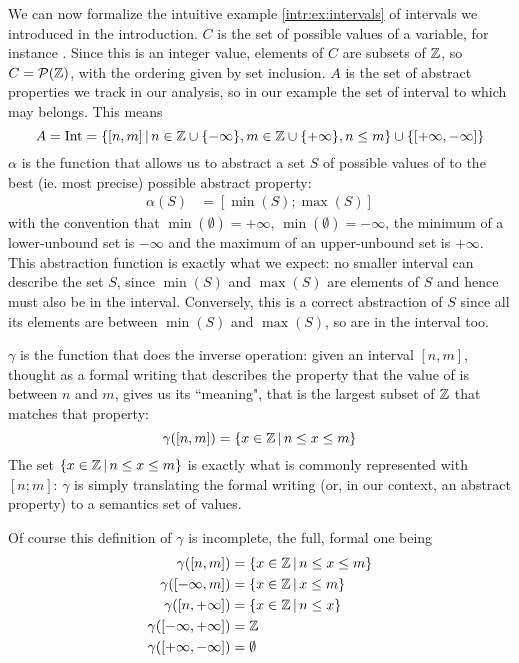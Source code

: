 \begin{example}[Intervals]\label{ch2:ex:intervals}
	We can now formalize the intuitive example \ref{intr:ex:intervals} of intervals we introduced in the introduction.
	$C$ is the set of possible values of a variable, for instance . Since this is an integer value, elements of $C$ are subsets of $\mathbb{Z}$, so $C = \mathcal{P}(\mathbb{Z})$, with the ordering given by set inclusion. $A$ is the set of abstract properties we track in our analysis, so in our example the set of interval to which  may belongs. This means
	\[
	A = \text{Int} = \{ [n, m] \,\vert\, n \in \mathbb{Z} \cup \{ -\infty \}, m \in \mathbb{Z} \cup \{ +\infty \}, n \le m \} \cup \{ [+\infty, -\infty] \}
	\]
	$\alpha$ is the function that allows us to abstract a set $S$ of possible values of  to the best (ie. most precise) possible abstract property:
	\begin{align*}
		\alpha(S) &= [\min(S); \max(S)]
	\end{align*}
	with the convention that $\min(\emptyset) = +\infty$, $\min(\emptyset) = -\infty$, the minimum of a lower-unbound set is $-\infty$ and the maximum of an upper-unbound set is $+\infty$. This abstraction function is exactly what we expect: no smaller interval can describe the set $S$, since $\min(S)$ and $\max(S)$ are elements of $S$ and hence must also be in the interval. Conversely, this is a correct abstraction of $S$ since all its elements are between $\min(S)$ and $\max(S)$, so are in the interval too.

	$\gamma$ is the function that does the inverse operation: given an interval $[n, m]$, thought as a formal writing that describes the property that the value of  is between $n$ and $m$, gives us its ``meaning", that is the largest subset of $\mathbb{Z}$ that matches that property:
	\[
	\gamma([n, m]) = \{ x \in \mathbb{Z} \,\vert\, n \le x \le m \}
	\]
	The set $\{ x \in \mathbb{Z} \,\vert\, n \le x \le m \}$ is exactly what is commonly represented with $[n; m]$: $\gamma$ is simply translating the formal writing (or, in our context, an abstract property) to a semantics set of values.

	Of course this definition of $\gamma$ is incomplete, the full, formal one being
	\begin{align*}
		\gamma([n, m]) &= \{ x \in \mathbb{Z} \,\vert\, n \le x \le m \} \\
		\gamma([-\infty, m]) &= \{ x \in \mathbb{Z} \,\vert\, x \le m \} \\
		\gamma([n, +\infty]) &= \{ x \in \mathbb{Z} \,\vert\, n \le x \} \\
		\gamma([-\infty, +\infty]) &= \mathbb{Z} \\
		\gamma([+\infty, -\infty]) &= \emptyset
	\end{align*}


\end{example}
